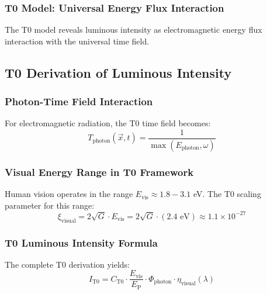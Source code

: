 \documentclass[12pt,a4paper]{article}
\newcommand{\xipar}{\xi}
\newcommand{\EP}{E_{\text{P}}}
\newcommand{\Evis}{E_{\text{vis}}}
\newcommand{\Cto}{C_{\text{T0}}}
\newcommand{\etavis}{\eta_{\text{visual}}}
\newcommand{\Phiphoton}{\Phi_{\text{photon}}}
\begin{document}
	\subsubsection{T0 Model: Universal Energy Flux Interaction}
	\label{subsubsec:t0_universal_flux}
	
	The T0 model reveals luminous intensity as electromagnetic energy flux interaction with the universal time field.
	
	\subsection{T0 Derivation of Luminous Intensity}
	\label{subsec:t0_candela_derivation}
	
	\subsubsection{Photon-Time Field Interaction}
	\label{subsubsec:photon_time_field}
	
	For electromagnetic radiation, the T0 time field becomes:
	\begin{equation}
		T_{\text{photon}}(\vec{x},t) = \frac{1}{\max(E_{\text{photon}}, \omega)}
		\label{eq:photon_time_field}
	\end{equation}
	
	\subsubsection{Visual Energy Range in T0 Framework}
	\label{subsubsec:visual_energy_range}
	
	Human vision operates in the range $\Evis \approx 1.8 - 3.1$ eV. The T0 scaling parameter for this range:
	\begin{equation}
		\xipar_{\text{visual}} = 2\sqrt{G} \cdot \Evis = 2\sqrt{G} \cdot (2.4 \text{ eV}) \approx 1.1 \times 10^{-27}
		\label{eq:xi_visual}
	\end{equation}
	
	\subsubsection{T0 Luminous Intensity Formula}
	\label{subsubsec:t0_luminous_formula}
	
	The complete T0 derivation yields:
	\begin{equation}
		\boxed{I_{\text{T0}} = \Cto \cdot \frac{\Evis}{\EP} \cdot \Phiphoton \cdot \etavis(\lambda)}
		\label{eq:t0_candela_fundamental}
	\end{equation}
	
\end{document}
